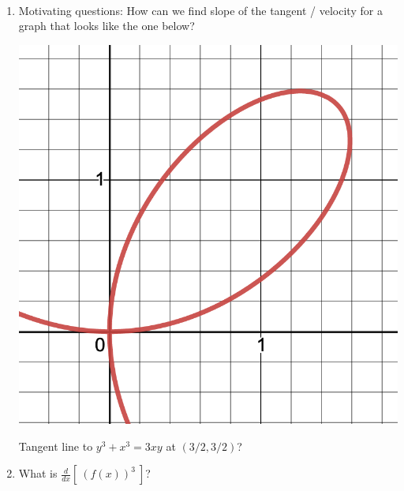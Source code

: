 \documentclass[11pt,fleqn]{article}
\begin{document}
\renewcommand{\headrulewidth}{0pt}
\newcommand{\blank}[1]{\rule{#1}{0.75pt}}
\newcommand{\bc}{\begin{center}}
\newcommand{\ec}{\end{center}}
\renewcommand{\d}{\displaystyle}

\vspace*{-0.7in}

\begin{center}
  \large
  \\
\end{center}
\begin{enumerate}
\item Motivating questions: How can we find slope of the tangent / velocity for a graph that looks like the one below?\\

\begin{multicols}{2}
\includegraphics[scale=.25]{loop-3-8.png}

Tangent line to $y^3+x^3=3xy$ at $(3/2,3/2)$?

\end{multicols}

\vspace{1in}
 
 \item What is \quad \large{${\displaystyle{ \frac{d}{dx}\left[\:\left(f(x) \right)^3\:\right]}}$}\quad?\\
 

\end{enumerate}
\end{document}
